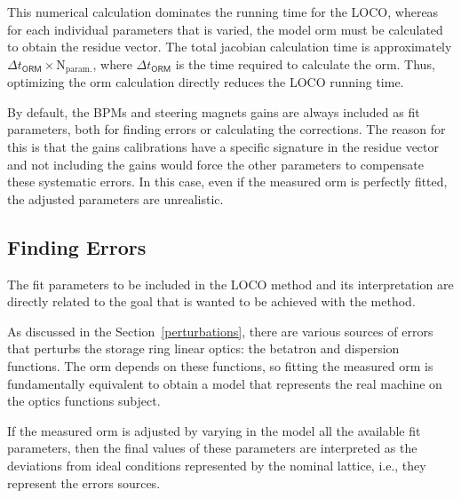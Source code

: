 This numerical calculation dominates the running time for the LOCO, whereas for each individual parameters that is varied, the model \gls{orm} must be calculated to obtain the residue vector. The total jacobian calculation time is approximately $\Delta t_{\mathsf{ORM}} \times \mathrm{N}_{\mathrm{param.}}$, where $\Delta t_{\mathsf{ORM}}$ is the time required to calculate the \gls{orm}. Thus, optimizing the \gls{orm} calculation directly reduces the LOCO running time. 

By default, the BPMs and steering magnets gains are always included as fit parameters, both for finding errors or calculating the corrections. The reason for this is that the gains calibrations have a specific signature in the residue vector and not including the gains would force the other parameters to compensate these systematic errors. In this case, even if the measured \gls{orm} is perfectly fitted, the adjusted parameters are unrealistic. 
\subsection{Finding Errors}
The fit parameters to be included in the LOCO method and its interpretation are directly related to the goal that is wanted to be achieved with the method. 

As discussed in the Section~\ref{perturbations}, there are various sources of errors that perturbs the storage ring linear optics: the betatron and dispersion functions. The \gls{orm} depends on these functions, so fitting the measured \gls{orm} is fundamentally equivalent to obtain a model that represents the real machine on the optics functions subject.

If the measured \gls{orm} is adjusted by varying in the model all the available fit parameters, then the final values of these parameters are interpreted as the deviations from ideal conditions represented by the nominal lattice, i.e., they represent the errors sources. 

